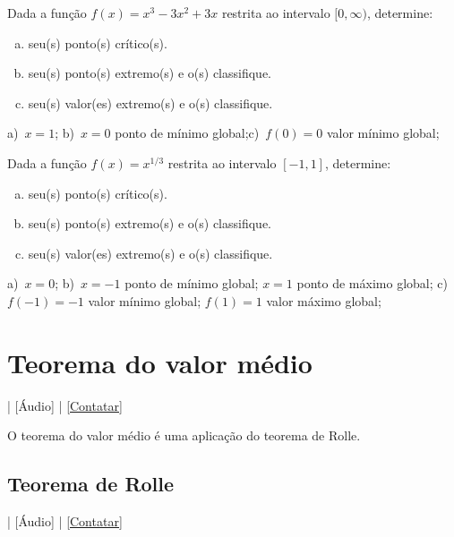 \begin{exer}
  Dada a função $f(x)=x^{3} - 3 x^{2} + 3 x$ restrita ao intervalo $[0, \infty)$, determine:
  \begin{enumerate}[a)]
  \item seu(s) ponto(s) crítico(s).
  \item seu(s) ponto(s) extremo(s) e o(s) classifique.
  \item seu(s) valor(es) extremo(s) e o(s) classifique.
  \end{enumerate}
\end{exer}
\begin{resp}
  a)~$x=1$; b)~$x=0$ ponto de mínimo global;c)~$f(0)=0$ valor mínimo global;
\end{resp}

\begin{exer}
  Dada a função $f(x)=x^{1/3}$ restrita ao intervalo $[-1,1]$, determine:
  \begin{enumerate}[a)]
  \item seu(s) ponto(s) crítico(s).
  \item seu(s) ponto(s) extremo(s) e o(s) classifique.
  \item seu(s) valor(es) extremo(s) e o(s) classifique.
  \end{enumerate}
\end{exer}
\begin{resp}
  a)~$x=0$; b)~$x=-1$ ponto de mínimo global; $x=1$ ponto de máximo global; c)~$f(-1)=-1$ valor mínimo global; $f(1)=1$ valor máximo global;
\end{resp}


\section{Teorema do valor médio}\label{cap_apderiv_sec_valormedio}

\begin{flushright}
  [Vídeo] | [Áudio] | \href{https://phkonzen.github.io/notas/contato.html}{[Contatar]}
\end{flushright}

O teorema do valor médio é uma aplicação do teorema de Rolle.

\subsection{Teorema de Rolle}

\begin{flushright}
  [Vídeo] | [Áudio] | \href{https://phkonzen.github.io/notas/contato.html}{[Contatar]}
\end{flushright}


